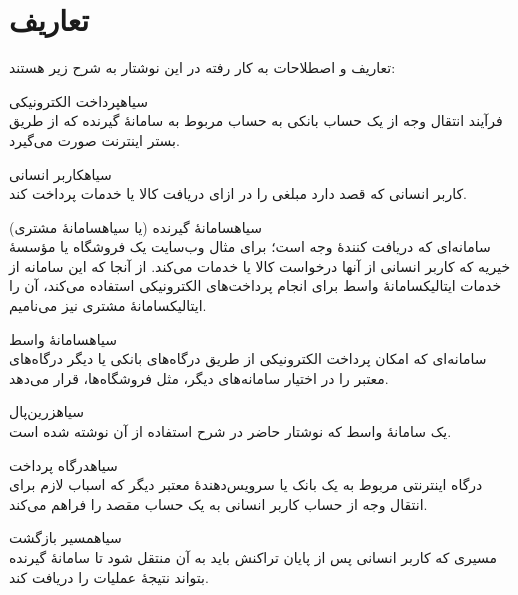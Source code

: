 \section{تعاریف}
\label{بخش:تعاریف}
تعاریف و اصطلاحات به کار رفته در این نوشتار
به شرح زیر هستند:
\begin{itemize}
	
 ‌سیاه{پرداخت الکترونیکی}\\
فرآیند انتقال وجه از یک حساب بانکی به حساب
مربوط به سامانهٔ گیرنده که از طریق بستر اینترنت
صورت می‌گیرد.

 ‌سیاه{کاربر انسانی}\\
کاربر انسانی که قصد دارد مبلغی را در ازای
دریافت کالا یا خدمات پرداخت کند.

 ‌سیاه{سامانهٔ گیرنده} (یا ‌سیاه{سامانهٔ مشتری})\\
سامانه‌ای که دریافت کنندهٔ وجه است؛
برای مثال وب‌سایت یک فروشگاه یا مؤسسهٔ خیریه
که کاربر انسانی از آنها درخواست کالا یا خدمات
می‌کند. از آنجا که این سامانه از خدمات
‌ایتالیک{سامانهٔ واسط} برای انجام
پرداخت‌های الکترونیکی استفاده می‌کند،
آن را ‌ایتالیک{سامانهٔ مشتری} نیز می‌نامیم.

 ‌سیاه{سامانهٔ واسط}\\
سامانه‌ای که امکان پرداخت الکترونیکی از طریق
درگاه‌های بانکی یا دیگر درگاه‌های معتبر را در
اختیار سامانه‌های دیگر، مثل فروشگاه‌ها، قرار می‌دهد.

	\begin{itemize}	
		 ‌سیاه{زرین‌پال}\\
		یک سامانهٔ واسط که نوشتار حاضر
		در شرح استفاده از آن نوشته شده است.
	\end{itemize}

 ‌سیاه{درگاه پرداخت}\\
درگاه اینترنتی مربوط به یک بانک یا سرویس‌دهندهٔ
معتبر دیگر که اسباب لازم برای انتقال وجه از
حساب کاربر انسانی به یک حساب مقصد را فراهم می‌کند.

 ‌سیاه{مسیر بازگشت}\\
مسیری که کاربر انسانی پس از پایان تراکنش باید
به آن منتقل شود تا سامانهٔ گیرنده بتواند نتیجهٔ
عملیات را دریافت کند.

\end{itemize}
